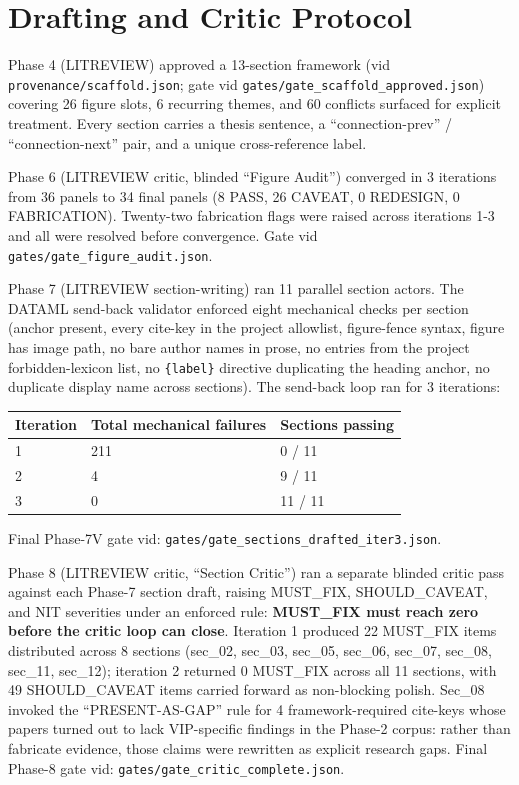 \documentclass[11pt]{article}
\begin{document}
\section{Drafting and Critic Protocol}\label{sec-methods-drafting}

Phase 4 (LITREVIEW) approved a 13-section framework (vid \texttt{provenance/scaffold.json}; gate vid \texttt{gates/gate\_scaffold\_approved.json}) covering 26 figure slots, 6 recurring themes, and 60 conflicts surfaced for explicit treatment. Every section carries a thesis sentence, a ``connection-prev'' / ``connection-next'' pair, and a unique cross-reference label.

Phase 6 (LITREVIEW critic, blinded ``Figure Audit'') converged in 3 iterations from 36 panels to 34 final panels (8 PASS, 26 CAVEAT, 0 REDESIGN, 0 FABRICATION). Twenty-two fabrication flags were raised across iterations 1-3 and all were resolved before convergence. Gate vid \texttt{gates/gate\_figure\_audit.json}.

Phase 7 (LITREVIEW section-writing) ran 11 parallel section actors. The DATAML send-back validator enforced eight mechanical checks per section (anchor present, every cite-key in the project allowlist, figure-fence syntax, figure has image path, no bare author names in prose, no entries from the project forbidden-lexicon list, no \texttt{\{label\}} directive duplicating the heading anchor, no duplicate display name across sections). The send-back loop ran for 3 iterations:

\bigskip\noindent
\begin{tabular}{p{}p{}p{}}
\toprule
Iteration & Total mechanical failures & Sections passing \\
\hline
1 & 211 & 0 / 11 \\
2 & 4 & 9 / 11 \\
3 & 0 & 11 / 11 \\
\bottomrule
\end{tabular}

\bigskip

Final Phase-7V gate vid: \texttt{gates/gate\_sections\_drafted\_iter3.json}.

Phase 8 (LITREVIEW critic, ``Section Critic'') ran a separate blinded critic pass against each Phase-7 section draft, raising MUST\_FIX, SHOULD\_CAVEAT, and NIT severities under an enforced rule: \textbf{MUST\_FIX must reach zero before the critic loop can close}. Iteration 1 produced 22 MUST\_FIX items distributed across 8 sections (sec\_02, sec\_03, sec\_05, sec\_06, sec\_07, sec\_08, sec\_11, sec\_12); iteration 2 returned 0 MUST\_FIX across all 11 sections, with 49 SHOULD\_CAVEAT items carried forward as non-blocking polish. Sec\_08 invoked the ``PRESENT-AS-GAP'' rule for 4 framework-required cite-keys whose papers turned out to lack VIP-specific findings in the Phase-2 corpus: rather than fabricate evidence, those claims were rewritten as explicit research gaps. Final Phase-8 gate vid: \texttt{gates/gate\_critic\_complete.json}.
\end{document}
